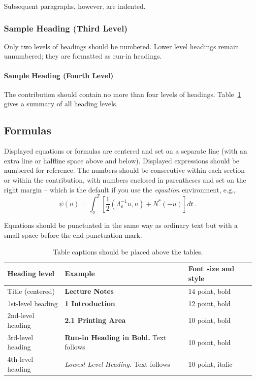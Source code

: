 \documentclass{llncs}
\begin{document}
Subsequent paragraphs, however, are indented.

\subsubsection{Sample Heading (Third Level)} Only two levels of
headings should be numbered. Lower level headings remain unnumbered;
they are formatted as run-in headings.

\paragraph{Sample Heading (Fourth Level)}
The contribution should contain no more than four levels of
headings. Table~\ref{tab1} gives a summary of all heading levels.


\subsection{Formulas}

Displayed equations or formulas are centered and set on a separate
line (with an extra line or halfline space above and below). Displayed
expressions should be numbered for reference. The numbers should be
consecutive within each section or within the contribution,
with numbers enclosed in parentheses and set on the right margin --
which is the default if you use the \emph{equation} environment, e.g.,
\begin{equation}
  \psi (u) = \int_{o}^{T} \left[\frac{1}{2}
  \left(\Lambda_{o}^{-1} u,u\right) + N^{\ast} (-u)\right] dt \;  .
\end{equation}

Equations should be punctuated in the same way as ordinary
text but with a small space before the end punctuation mark.


\begin{table}
\caption{Table captions should be placed above the
tables.}\label{tab1}
\begin{tabular}{|l|l|l|}
\hline
Heading level &  Example & Font size and style\\
\hline
Title (centered) &  {\Large\bfseries Lecture Notes} & 14 point, bold\\
1st-level heading &  {\large\bfseries 1 Introduction} & 12 point, bold\\
2nd-level heading & {\bfseries 2.1 Printing Area} & 10 point, bold\\
3rd-level heading & {\bfseries Run-in Heading in Bold.} Text follows & 10 point, bold\\
4th-level heading & {\itshape Lowest Level Heading.} Text follows & 10 point, italic\\
\hline
\end{tabular}
\end{table}
\end{document}
